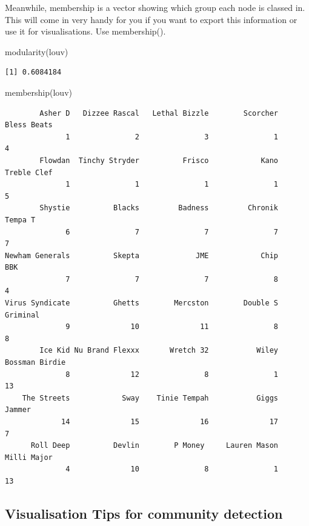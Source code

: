 \documentclass[
  letterpaper,
  DIV=11,
  numbers=noendperiod]{scrreprt}
\newenvironment{Shaded}{\begin{snugshade}}{\end{snugshade}}
\newcommand{\FunctionTok}[1]{\textcolor[rgb]{0.28,0.35,0.67}{#1}}
\newcommand{\NormalTok}[1]{\textcolor[rgb]{0.00,0.23,0.31}{#1}}
\begin{document}
Meanwhile, membership is a vector showing which group each node is
classed in. This will come in very handy for you if you want to export
this information or use it for visualisations. Use membership().

\begin{Shaded}
\begin{Highlighting}[]
\FunctionTok{modularity}\NormalTok{(louv)}
\end{Highlighting}
\end{Shaded}

\begin{verbatim}
[1] 0.6084184
\end{verbatim}

\begin{Shaded}
\begin{Highlighting}[]
\FunctionTok{membership}\NormalTok{(louv)}
\end{Highlighting}
\end{Shaded}

\begin{verbatim}
        Asher D   Dizzee Rascal   Lethal Bizzle        Scorcher     Bless Beats 
              1               2               3               1               4 
        Flowdan  Tinchy Stryder          Frisco            Kano     Treble Clef 
              1               1               1               1               5 
        Shystie          Blacks         Badness         Chronik         Tempa T 
              6               7               7               7               7 
Newham Generals          Skepta             JME            Chip             BBK 
              7               7               7               8               4 
Virus Syndicate          Ghetts        Mercston        Double S        Griminal 
              9              10              11               8               8 
        Ice Kid Nu Brand Flexxx       Wretch 32           Wiley  Bossman Birdie 
              8              12               8               1              13 
    The Streets            Sway    Tinie Tempah           Giggs          Jammer 
             14              15              16              17               7 
      Roll Deep          Devlin        P Money     Lauren Mason     Milli Major 
              4              10               8               1              13 
\end{verbatim}

\subsection{Visualisation Tips for community
detection}\label{visualisation-tips-for-community-detection}
\end{document}
